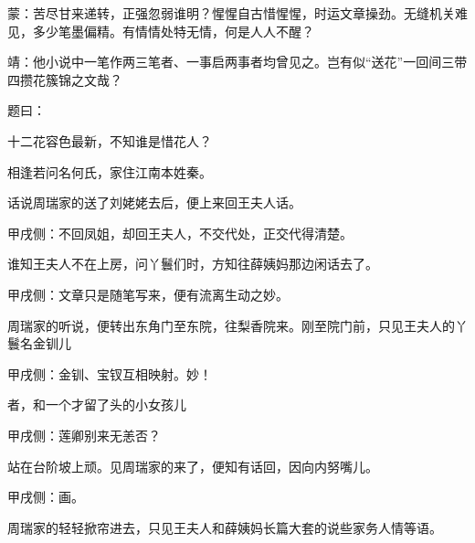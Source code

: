 \begin{parag}
    \begin{note}蒙：苦尽甘来递转，正强忽弱谁明？惺惺自古惜惺惺，时运文章操劲。无缝机关难见，多少笔墨偏精。有情情处特无情，何是人人不醒？\end{note}
\end{parag}


\begin{parag}
    \begin{note}靖：他小说中一笔作两三笔者、一事启两事者均曾见之。岂有似“送花”一回间三带四攒花簇锦之文哉？\end{note}
\end{parag}


\begin{parag}
    题曰：
\end{parag}


\begin{poem}
    \begin{pl}十二花容色最新，不知谁是惜花人？\end{pl}

    \begin{pl}相逢若问名何氏，家住江南本姓秦。\end{pl}
\end{poem}


\begin{parag}
    话说周瑞家的送了刘姥姥去后，便上来回王夫人话。\begin{note}甲戌侧：不回凤姐，却回王夫人，不交代处，正交代得清楚。\end{note}谁知王夫人不在上房，问丫鬟们时，方知往薛姨妈那边闲话去了。\begin{note}甲戌侧：文章只是随笔写来，便有流离生动之妙。\end{note}周瑞家的听说，便转出东角门至东院，往梨香院来。刚至院门前，只见王夫人的丫鬟名金钏儿\begin{note}甲戌侧：金钏、宝钗互相映射。妙！\end{note}者，和一个才留了头的小女孩儿\begin{note}甲戌侧：莲卿别来无恙否？\end{note}站在台阶坡上顽。见周瑞家的来了，便知有话回，因向内努嘴儿。\begin{note}甲戌侧：画。\end{note}周瑞家的轻轻掀帘进去，只见王夫人和薛姨妈长篇大套的说些家务人情等语。
\end{parag}


